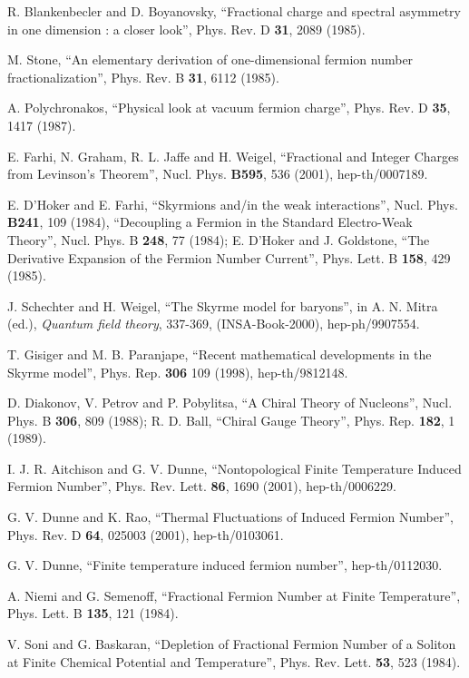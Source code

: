\documentclass[a4paper,prd]{revtex4}
\begin{document}
\begin{thebibliography}{99}
 R.  Blankenbecler and D.  Boyanovsky,  ``Fractional charge 
and spectral asymmetry in one dimension : a closer look'',  Phys.  Rev. 
D  {\bf 31}, 2089 (1985). 

 M.  Stone,  ``An elementary derivation of one-dimensional
fermion number fractionalization'',  Phys. Rev. B {\bf 31}, 6112 (1985). 

 A. Polychronakos, ``Physical look at vacuum fermion charge'', Phys.
Rev. D {\bf 35}, 1417 (1987).

 E. Farhi,  N. Graham,  R. L. Jaffe and H. Weigel, 
``Fractional and Integer Charges from Levinson's Theorem'', Nucl. Phys. 
{\bf B595}, 536 (2001), hep-th/0007189. 

 E.  D'Hoker and E.  Farhi,  ``Skyrmions and/in the
weak interactions'',  Nucl.  Phys.  {\bf B241}, 109 (1984), 
``Decoupling a Fermion in the Standard Electro-Weak  Theory'',  Nucl. 
Phys.  B {\bf 248}, 77 (1984); E.  D'Hoker and J.  Goldstone,  ``The
Derivative Expansion of the Fermion Number Current'',  Phys.  Lett.  B
{\bf 158}, 429 (1985). 

 J. Schechter and H. Weigel, ``The Skyrme model
for baryons'', in A. N. Mitra (ed.), {\it Quantum field theory},
337-369, (INSA-Book-2000), hep-ph/9907554.

 T. Gisiger and M. B. Paranjape, ``Recent mathematical
developments in the Skyrme model'', Phys. Rep. {\bf 306} 109 (1998),
hep-th/9812148. 

 D.  Diakonov, V. Petrov and  P. Pobylitsa,  ``A
Chiral Theory of Nucleons'',  Nucl.  Phys.  B {\bf 306}, 809 (1988);
R.  D.  Ball,  ``Chiral Gauge Theory'',  Phys.  Rep. {\bf 182}, 1 (1989). 

 I. J. R.  Aitchison and G. V.  Dunne,  ``Nontopological Finite
Temperature Induced Fermion Number'',  Phys.  Rev.  Lett.  {\bf 86}, 1690
(2001), hep-th/0006229. 

 G. V.  Dunne and K. Rao,  ``Thermal Fluctuations of Induced
Fermion Number'',  Phys.  Rev.  D {\bf 64}, 025003 (2001), hep-th/0103061.

 G. V. Dunne, ``Finite temperature induced fermion number'',
hep-th/0112030.

 A.  Niemi and G.  Semenoff,  ``Fractional Fermion Number at
Finite  Temperature'',  Phys.  Lett.  B {\bf 135}, 121 (1984). 

 V.  Soni and G.  Baskaran,  ``Depletion of Fractional Fermion
Number of a Soliton at Finite Chemical  Potential and Temperature'',  Phys. 
Rev.  Lett.  {\bf 53}, 523 (1984). 


\end{thebibliography}
\end{document}
